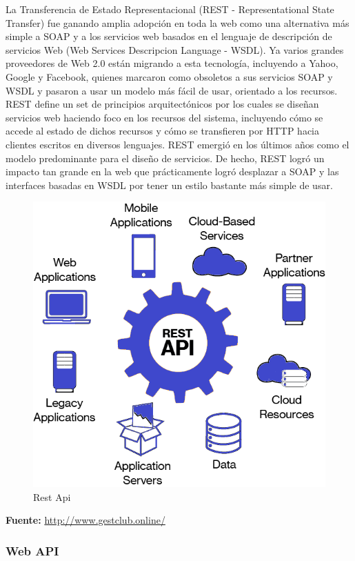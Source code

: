 		{La Transferencia de Estado Representacional (REST - Representational State Transfer) fue ganando amplia adopción en toda la web como una alternativa más simple a SOAP y a los servicios web basados en el lenguaje de descripción de servicios Web (Web Services Descripcion Language - WSDL). Ya varios grandes proveedores de Web 2.0 están migrando a esta tecnología, incluyendo a Yahoo, Google y Facebook, quienes marcaron como obsoletos a sus servicios SOAP y WSDL y pasaron a usar un modelo más fácil de usar, orientado a los recursos.\\
			
		REST define un set de principios arquitectónicos por los cuales se diseñan servicios web haciendo foco en los recursos del sistema, incluyendo cómo se accede al estado de dichos recursos y cómo se transfieren por HTTP hacia clientes escritos en diversos lenguajes. REST emergió en los últimos años como el modelo predominante para el diseño de servicios. De hecho, REST logró un impacto tan grande en la web que prácticamente logró desplazar a SOAP y las interfaces basadas en WSDL por tener un estilo bastante más simple de usar. \cite{restful}
		
		\begin{figure}[H]
			\centering
			\includegraphics[width=0.6\linewidth]{description/framework/restful.png}
			\caption{Rest Api}
		\end{figure}
		\begin{center}
			\textbf{Fuente:} \url{http://www.gestclub.online/}
		\end{center}
		}
	
	
		\subsubsection{Web API}
		
